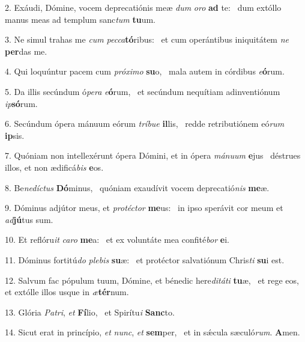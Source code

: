 2. Exáudi, Dómine, vocem deprecatiónis meæ \textit{dum} \textit{o}\textit{ro} \textbf{ad} te: \ast\  dum extóllo manus meas ad templum sanc\textit{tum} \textbf{tu}um.\

3. Ne simul trahas me \textit{cum} \textit{pec}\textit{ca}\textbf{tó}ribus: \ast\  et cum operántibus iniquitátem \textit{ne} \textbf{per}das me.\

4. Qui loquúntur pacem cum \textit{pró}\textit{xi}\textit{mo} \textbf{su}o, \ast\  mala autem in córdibus \textit{e}\textbf{ó}rum.\

5. Da illis secúndum ó\textit{pe}\textit{ra} \textit{e}\textbf{ó}rum, \ast\  et secúndum nequítiam adinventiónum \textit{ip}\textbf{só}rum.\

6. Secúndum ópera mánuum eórum \textit{trí}\textit{bu}\textit{e} \textbf{il}lis, \ast\  redde retributiónem eó\textit{rum} \textbf{ip}sis.\

7. Quóniam non intellexérunt ópera Dómini, et in ópera \textit{má}\textit{nu}\textit{um} \textbf{e}jus \ast\  déstrues illos, et non ædificá\textit{bis} \textbf{e}os.\

8. Be\textit{ne}\textit{díc}\textit{tus} \textbf{Dó}minus, \ast\  quóniam exaudívit vocem deprecatió\textit{nis} \textbf{me}æ.\

9. Dóminus adjútor meus, et \textit{pro}\textit{téc}\textit{tor} \textbf{me}us: \ast\  in ipso sperávit cor meum et \textit{ad}\textbf{jú}tus sum.\

10. Et reflóru\textit{it} \textit{ca}\textit{ro} \textbf{me}a: \ast\  et ex voluntáte mea confité\textit{bor} \textbf{e}i.\

11. Dóminus fortitú\textit{do} \textit{ple}\textit{bis} \textbf{su}æ: \ast\  et protéctor salvatiónum Chris\textit{ti} \textbf{su}i est.\

12. Salvum fac pópulum tuum, Dómine, et bénedic here\textit{di}\textit{tá}\textit{ti} \textbf{tu}æ, \ast\  et rege eos, et extólle illos usque in \textit{æ}\textbf{tér}num.\

13. Glória \textit{Pa}\textit{tri}, \textit{et} \textbf{Fí}lio, \ast\  et Spirítu\textit{i} \textbf{Sanc}to.\

14. Sicut erat in princípio, \textit{et} \textit{nunc}, \textit{et} \textbf{sem}per, \ast\  et in sǽcula sæculó\textit{rum}. \textbf{A}men.\

